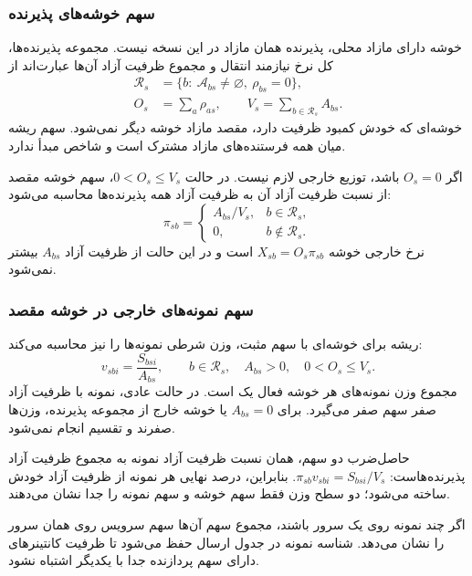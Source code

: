 \subsubsection{سهم خوشه‌های پذیرنده}

خوشه دارای مازاد محلی، پذیرنده همان مازاد در این نسخه نیست. مجموعه پذیرنده‌ها، کل نرخ نیازمند انتقال و مجموع ظرفیت آزاد آن‌ها عبارت‌اند از
\begin{align}
 \mathcal R_s&=\{b:\ \mathcal A_{bs}\ne\varnothing,\ \rho_{bs}=0\},
 \label{eq:receiver-set}\\
 O_s&=\sum_a\rho_{as},\qquad
 V_s=\sum_{b\in\mathcal R_s}A_{bs}.
 \label{eq:root-overflow}
\end{align}
خوشه‌ای که خودش کمبود ظرفیت دارد، مقصد مازاد خوشه دیگر نمی‌شود. سهم ریشه میان همه فرستنده‌های مازاد مشترک است و شاخص مبدأ ندارد.

اگر $O_s=0$ باشد، توزیع خارجی لازم نیست. در حالت $0<O_s\leq V_s$، سهم خوشه مقصد از نسبت ظرفیت آزاد آن به ظرفیت آزاد همه پذیرنده‌ها محاسبه می‌شود:
\begin{equation}
 \pi_{sb}=\begin{cases}
 A_{bs}/V_s,&b\in\mathcal R_s,\\
 0,&b\notin\mathcal R_s.
 \end{cases}
 \label{eq:root-normal-weights}
\end{equation}
نرخ خارجی خوشه $X_{sb}=O_s\pi_{sb}$ است و در این حالت از ظرفیت آزاد $A_{bs}$ بیشتر نمی‌شود.

\subsubsection{سهم نمونه‌های خارجی در خوشه مقصد}

ریشه برای خوشه‌ای با سهم مثبت، وزن شرطی نمونه‌ها را نیز محاسبه می‌کند:
\begin{equation}
 v_{sbi}=\frac{S_{bsi}}{A_{bs}},\qquad
 b\in\mathcal R_s,\quad A_{bs}>0,\quad 0<O_s\leq V_s.
 \label{eq:foreign-conditional}
\end{equation}
مجموع وزن نمونه‌های هر خوشه فعال یک است. در حالت عادی، نمونه با ظرفیت آزاد صفر سهم صفر می‌گیرد. برای $A_{bs}=0$ یا خوشه خارج از مجموعه پذیرنده، وزن‌ها صفرند و تقسیم انجام نمی‌شود.

حاصل‌ضرب دو سهم، همان نسبت ظرفیت آزاد نمونه به مجموع ظرفیت آزاد پذیرنده‌هاست: $\pi_{sb}v_{sbi}=S_{bsi}/V_s$. بنابراین، درصد نهایی هر نمونه از ظرفیت آزاد خودش ساخته می‌شود؛ دو سطح وزن فقط سهم خوشه و سهم نمونه را جدا نشان می‌دهند.

اگر چند نمونه روی یک سرور باشند، مجموع سهم آن‌ها سهم سرویس روی همان سرور را نشان می‌دهد. شناسه نمونه در جدول ارسال حفظ می‌شود تا ظرفیت کانتینرهای دارای سهم پردازنده جدا با یکدیگر اشتباه نشود.

